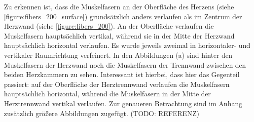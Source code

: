 \documentclass[
	a4paper,			%
	11pt,				%
	headsepline,		%
	bibtotoc,			%
	BCOR18mm,      		%
	DIV14,				%
	headings=normal,
	numbers=noenddot,
]{scrbook}
\theoremstyle{mythmstyle}
\theoremstyle{other}
\begin{document}
	Zu erkennen ist, dass die Muskelfasern an der Oberfläche des Herzens (siehe
	 \autoref{figure:fibers_200_surface}) grundsätzlich anders verlaufen als
	im Zentrum der Herzwand (siehe \autoref{figure:fibers_200}). 
	An der Oberfläche verlaufen die Muskelfasern hauptsächlich vertikal, während
	sie in der Mitte der Herzwand hauptsächlich horizontal verlaufen. Es wurde jeweils zweimal in horizontaler-
	und vertikaler Raumrichtung verfeinert. In den Abbildungen (a) sind hinter den Muskelfasern der Herzwand
	noch die Muskelfasern der Trennwand zwischen den beiden Herzkammern zu sehen. Interessant ist hierbei,
	dass hier das Gegenteil passiert: auf der Oberfläche der Herztrennwand verlaufen die Muskelfasern
	hauptsächlich horizontal, während die Muskelfasern in der Mitte der Herztrennwand vertikal verlaufen.
	Zur genaueren Betrachtung sind im 
	Anhang zusätzlich größere Abbildungen zugefügt. (TODO: REFERENZ)
	

	
	
	
	
	\printglossary[type=\acronymtype,title=List of Notation and Abbreviations]
	
	
	
\end{document}
